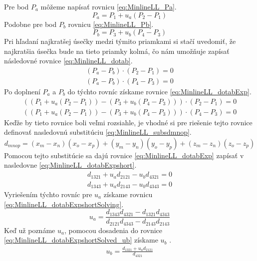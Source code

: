 Pre bod $P_a$ môžeme napísať rovnicu  \ref{eq:MinlineLL_Pa}.
\begin{equation}
P_a=P_1 + u_a(P_2-P_1)
    \label{eq:MinlineLL_Pa}
\end{equation}
Podobne pre bod $P_b$ rovnicu \ref{eq:MinlineLL_Pb}.
\begin{equation}
P_b=P_3 + u_b(P_4-P_3)
    \label{eq:MinlineLL_Pb}
\end{equation}
Pri hľadaní najkratšej úsečky medzi týmito priamkami si stačí uvedomiť, že najkratšia úsečka bude na tieto priamky kolmá, čo nám umožňuje zapísať následovné rovnice  \ref{eq:MinlineLL_dotab}.
\begin{equation}
\begin{aligned}
(P_a-P_b) \cdot (P_2-P_1) =0\\
(P_a-P_b) \cdot (P_4-P_3) =0
\end{aligned}
    \label{eq:MinlineLL_dotab}
\end{equation}
Po doplnení  $P_a$ a $P_b$ do týchto rovníc získame rovnice \ref{eq:MinlineLL_dotabExp}.
\begin{equation}
\begin{aligned}
((P_1 + u_a(P_2-P_1))-(P_3 + u_b(P_4-P_3))) \cdot (P_2-P_1) =0\\
((P_1 + u_a(P_2-P_1))-(P_3 + u_b(P_4-P_3))) \cdot (P_4-P_3) =0
\end{aligned}
    \label{eq:MinlineLL_dotabExp}
\end{equation}
Keďže by tieto rovnice boli veľmi rozsiahle, je vhodné si pre riešenie tejto rovnice definovať nasledovnú substitúciu \ref{eq:MinlineLL_subsdmnop}.
\begin{equation}
d_{mnop}=(x_m - x_n)(x_o-x_p)+(y_m - y_n)(y_o-y_p)+(z_m - z_n)(z_o-z_p)
    \label{eq:MinlineLL_subsdmnop}
\end{equation}
Pomocou tejto substitúcie sa dajú rovnice \ref{eq:MinlineLL_dotabExp} zapísať v nasledovne \ref{eq:MinlineLL_dotabExpshort}.
\begin{equation}
\begin{aligned}
d_{1321} + u_a d_{2121} - u_b d_{4321} = 0\\
d_{1343} + u_a d_{2143} - u_b d_{4343} = 0
\end{aligned}
    \label{eq:MinlineLL_dotabExpshort}
\end{equation}
Vyriešením týchto rovníc pre $u_a$ získame rovnicu \ref{eq:MinlineLL_dotabExpshortSolving}.
\begin{equation}
 u_a= \frac
 {d_{1343} d_{4321} - d_{1321} d_{4343} }
 {d_{2121} d_{4343} - d_{2143} d_{2143} }
    \label{eq:MinlineLL_dotabExpshortSolving}
\end{equation}
Keď už poznáme $u_a$, pomocou dosadenia do rovnice \ref{eq:MinlineLL_dotabExpshortSolved_ub} získame $u_b$ \cite{bourke_Point_Line_Plane}.
\begin{equation}
\begin{aligned}
u_b  = \frac{d_{1321} + u_a d_{2121}}{d_{4321}}
\end{aligned}
    \label{eq:MinlineLL_dotabExpshortSolved_ub}
\end{equation}



